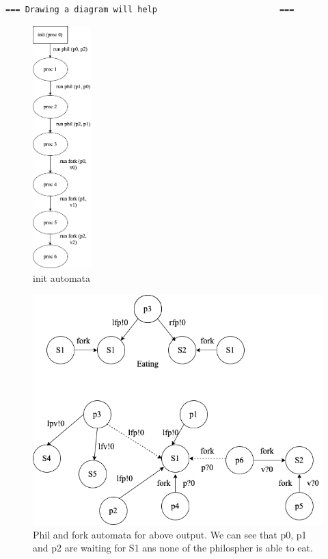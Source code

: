 \documentclass[10pt]{article}
\begin{document}
\begin{scriptsize}
\begin{verbatim}
=== Drawing a diagram will help                         ===
\end{verbatim}

\begin{figure}
    \centering
    \includegraphics[width=0.2\textwidth]{StateDiag1.png}
    \caption{init automata}
    \label{fig:my_label}
\end{figure}
\begin{figure}
    \centering
    \includegraphics[width=\textwidth]{StateDiag2.png}
    \caption{Phil and fork automata for above output. We can see that p0, p1 and p2 are waiting for S1 ans none of the philospher is able to eat.}
    \label{fig:my_label}
\end{figure}
\end{scriptsize}
\end{document}
